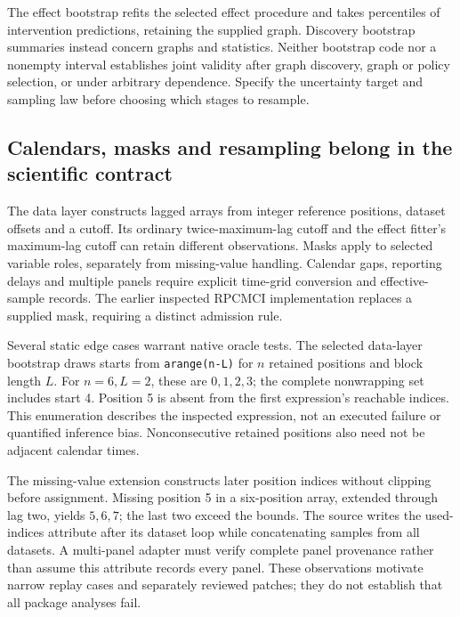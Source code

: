The effect bootstrap refits the selected effect procedure and takes percentiles of intervention predictions, retaining the supplied graph. Discovery bootstrap summaries instead concern graphs and statistics. Neither bootstrap code nor a nonempty interval establishes joint validity after graph discovery, graph or policy selection, or under arbitrary dependence. Specify the uncertainty target and sampling law before choosing which stages to resample. \cite{exec23_tigramite_reuse_source}

\subsection{Calendars, masks and resampling belong in the scientific contract}
\label{exec23:tigramite-calendar}
The data layer constructs lagged arrays from integer reference positions, dataset offsets and a cutoff. Its ordinary twice-maximum-lag cutoff and the effect fitter's maximum-lag cutoff can retain different observations. Masks apply to selected variable roles, separately from missing-value handling. Calendar gaps, reporting delays and multiple panels require explicit time-grid conversion and effective-sample records. The earlier inspected RPCMCI implementation replaces a supplied mask, requiring a distinct admission rule. \cite{exec23_tigramite_reuse_source}

Several static edge cases warrant native oracle tests. The selected data-layer bootstrap draws starts from \texttt{arange(n-L)} for $n$ retained positions and block length $L$. For $n=6,L=2$, these are $0,1,2,3$; the complete nonwrapping set includes start 4. Position 5 is absent from the first expression's reachable indices. This enumeration describes the inspected expression, not an executed failure or quantified inference bias. Nonconsecutive retained positions also need not be adjacent calendar times. \cite{exec23_tigramite_reuse_source,exec23_tigramite_reference}

The missing-value extension constructs later position indices without clipping before assignment. Missing position 5 in a six-position array, extended through lag two, yields $5,6,7$; the last two exceed the bounds. The source writes the used-indices attribute after its dataset loop while concatenating samples from all datasets. A multi-panel adapter must verify complete panel provenance rather than assume this attribute records every panel. These observations motivate narrow replay cases and separately reviewed patches; they do not establish that all package analyses fail. \cite{exec23_tigramite_reuse_source,exec23_tigramite_reference}

